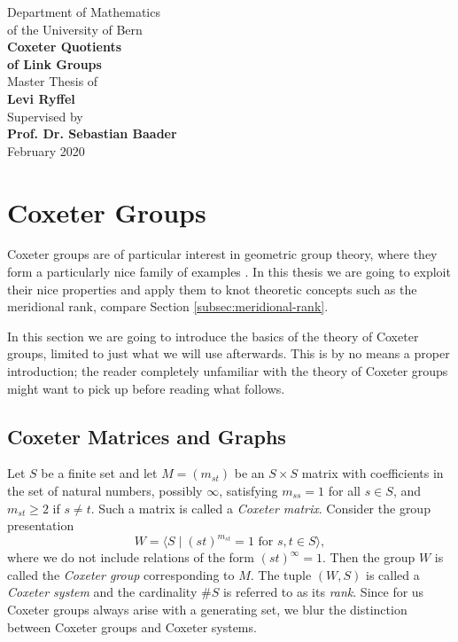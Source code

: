 \documentclass{article}
\theoremstyle{definition}
\begin{document}
\begin{titlepage}
\begin{center}
\vspace*{1.5cm}
\Large{Department of Mathematics \\ of the University of Bern}\\
\vspace*{3.5cm}
\Huge{\textbf{Coxeter Quotients \\ of Link Groups}}\\
\vspace*{6.5cm}
\Large{Master Thesis of} \\ \Large{\textbf{Levi Ryffel}}\\
\vspace*{.25cm}
Supervised by \\ \textbf{Prof. Dr. Sebastian Baader}\\
\vspace*{2cm}
February 2020
\end{center}
\end{titlepage}

\tableofcontents
\newpage

\section{Coxeter Groups}
Coxeter groups are of particular interest in geometric group theory, where they form a particularly nice family of examples \cite{davis2008}.
In this thesis we are going to exploit their nice properties and apply them to knot theoretic concepts such as the meridional rank, compare Section \ref{subsec:meridional-rank}.

In this section we are going to introduce the basics of the theory of Coxeter groups, limited to just what we will use afterwards. This is by no means a proper introduction; the reader completely unfamiliar with the theory of Coxeter groups might want to pick up \cite{humphreys1990} before reading what follows.

\subsection{Coxeter Matrices and Graphs}
Let $S$ be a finite set and let $M = (m_{st})$ be an $S \times S$ matrix with coefficients in the set of natural numbers, possibly $\infty$, satisfying $m_{ss} = 1$ for all $s \in S$, and $m_{st} \geq 2$ if $s \ne t$. Such a matrix is called a \textit{Coxeter matrix}. Consider the group presentation
$$W = \langle S \; | \; (st)^{m_{st}} = 1 \text{ for } s,t\in S \rangle,$$
where we do not include relations of the form $(st)^\infty = 1$.
Then the group $W$ is called the \textit{Coxeter group} corresponding to $M$. The tuple $(W,S)$ is called a \textit{Coxeter system} and the cardinality $\#S$ is referred to as its \textit{rank}. Since for us Coxeter groups always arise with a generating set, we blur the distinction between Coxeter groups and Coxeter systems.
\end{document}
